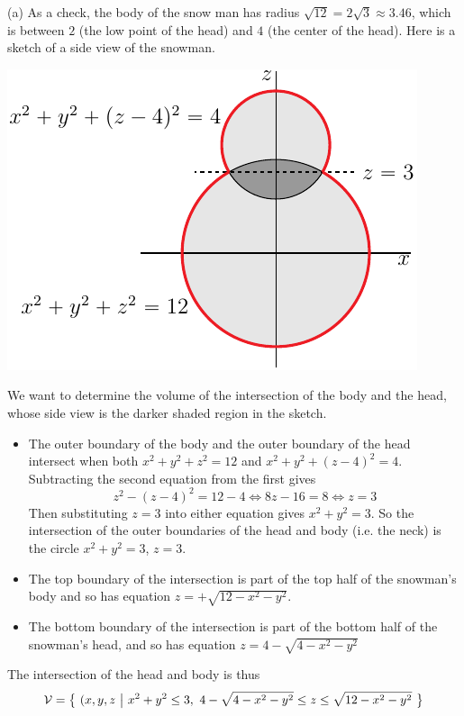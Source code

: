 \begin{solution}
(a) 
As a check, the body of the snow man has radius $\sqrt{12} = 2\sqrt{3}
\approx 3.46$, which is between $2$ (the low point of the head) and $4$
(the center of the head). Here is a sketch of a side view of the snowman.
\begin{center}
     \includegraphics{fig/OE11D_8a.pdf}
\end{center}
We want to determine the volume of the intersection of the body and the head,
whose side view is the darker shaded region in the sketch.
\begin{itemize}
\item
The outer boundary of the body and the outer boundary of the head 
intersect when both $x^2 + y^2 + z^2 = 12$ and $x^2 + y^2 + (z - 4)^2 = 4$.
Subtracting the second equation from the first gives
\begin{equation*}
z^2-(z-4)^2 =12 -4
\iff
8z-16 =8
\iff
z=3
\end{equation*}
Then substituting $z=3$ into either equation gives $x^2+y^2=3$.
So the intersection of the outer boundaries of the head and body 
(i.e. the neck)
is the circle $x^2+y^2=3$, $z=3$.
\item
The top boundary of the intersection is part of the top half
of the snowman's body and so has equation $z=+\sqrt{12-x^2-y^2}$.
\item
The bottom boundary of the intersection is part of the bottom half of the snowman's head, and so has equation $z=4-\sqrt{4-x^2-y^2}$
\end{itemize}
The intersection of the head and body is thus
\begin{align*}
\cV = \Set{(x,y,z}{x^2+y^2\le 3,\ 
            4-\sqrt{4-x^2-y^2}\le z\le \sqrt{12-x^2-y^2}}

\end{align*}
\end{solution}
